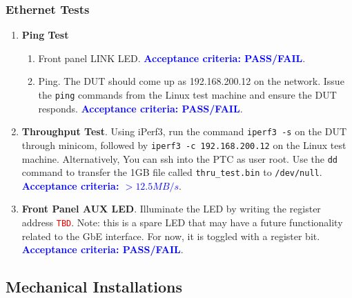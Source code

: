 \documentclass[a4paper,12pt]{article}
\begin{document}
\subsubsection{Ethernet Tests}
\label{section:eth_tests}

    \begin{enumerate}
        \item \textbf{Ping Test}
            \begin{enumerate}
                \item Front panel LINK LED. \textcolor{blue}{\textbf{Acceptance criteria: PASS/FAIL}}.
                \item Ping. The DUT should come up as 192.168.200.12 on the network. Issue the \texttt{ping} commands from the Linux test machine and ensure the DUT responds. \textcolor{blue}{\textbf{Acceptance criteria: PASS/FAIL}}.
            \end{enumerate}
        \item \textbf{Throughput Test}. Using iPerf3, run the command \texttt{iperf3 -s} on the DUT through minicom, followed by \texttt{iperf3 -c 192.168.200.12} on the Linux test machine. Alternatively, You can ssh into the PTC as user root. 
        Use the \texttt{dd} command to transfer the 1GB file called \texttt{thru\_test.bin} to \verb|/dev/null|. \textcolor{blue}{\textbf{Acceptance criteria: $>12.5MB/s$}}.
        \item \textbf{Front Panel AUX LED}. Illuminate the LED by writing the register address \texttt{\textcolor{red}{TBD}}. Note: this is a spare LED that may have a future functionality related to the GbE interface. For now, it is toggled with a register bit. \textcolor{blue}{\textbf{Acceptance criteria: PASS/FAIL}}.
    \end{enumerate}

\newpage
\subsection{Mechanical Installations}
\label{section:mechanical}
\end{document}
